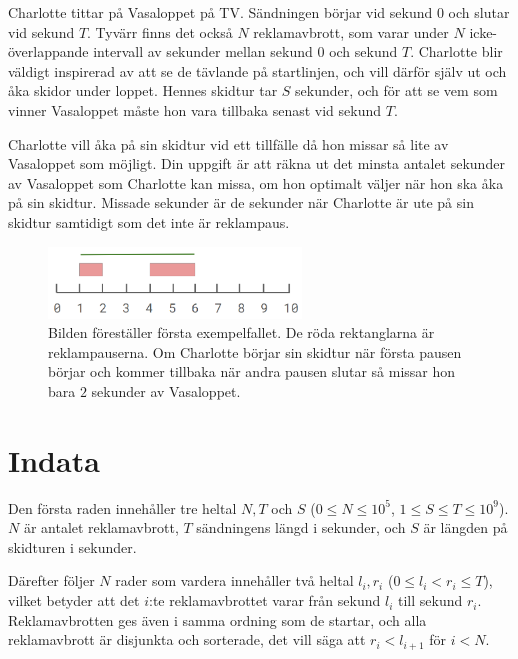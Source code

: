 \noindent
Charlotte tittar på Vasaloppet på TV. Sändningen börjar vid sekund $0$ och slutar vid sekund $T$. Tyvärr finns det
också $N$ reklamavbrott, som varar under $N$ icke-överlappande intervall av sekunder mellan sekund $0$ och sekund $T$. 
Charlotte blir väldigt inspirerad av att se de tävlande på startlinjen, 
och vill därför själv ut och åka skidor under loppet.
Hennes skidtur tar $S$ sekunder, och för att se vem som vinner Vasaloppet måste hon vara tillbaka senast vid sekund $T$.

Charlotte vill åka på sin skidtur vid ett tillfälle då hon missar så lite av Vasaloppet som möjligt. Din uppgift
är att räkna ut det minsta antalet sekunder av Vasaloppet som Charlotte kan missa,
om hon optimalt väljer när hon ska åka på sin skidtur.
Missade sekunder är de sekunder när Charlotte är ute på sin skidtur samtidigt som det inte är reklampaus.

\begin{centering}
  \begin{figure}[h]
      \centering
      \includegraphics[width=0.6\textwidth]{sample1.PNG}
      \caption{Bilden föreställer första exempelfallet. De röda rektanglarna är reklampauserna. Om Charlotte börjar sin skidtur när första pausen börjar och kommer tillbaka när andra pausen slutar så missar hon bara $2$ sekunder av Vasaloppet.}
      \label{fig:enter-label}
  \end{figure}
\end{centering}

\section*{Indata}
Den första raden innehåller tre heltal $N,T$ och $S$ ($0 \leq N \leq 10^5$, $1 \leq S \leq T \leq 10^9$). 
$N$ är antalet reklamavbrott, $T$ sändningens längd i sekunder, och $S$ är längden på skidturen i sekunder.

Därefter följer $N$ rader som vardera innehåller två heltal $l_i, r_i$ ($0 \leq l_i < r_i \leq T$),
vilket betyder att det $i$:te reklamavbrottet varar från sekund $l_i$ till sekund $r_i$.\\
Reklamavbrotten ges även i samma ordning som de startar, och alla reklamavbrott är disjunkta och sorterade, 
det vill säga att $r_i < l_{i+1}$ för $i < N$. 


